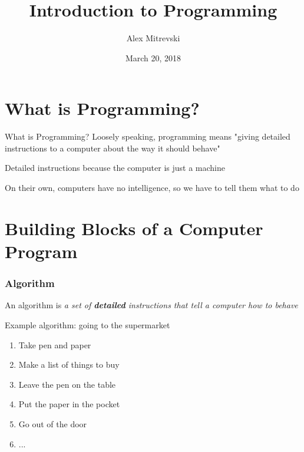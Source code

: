 \documentclass{beamer}
\author[Alex Mitrevski]{Alex Mitrevski}
\title{Introduction to Programming}
\subtitle{}
\institute[HBRS]{Hochschule Bonn-Rhein-Sieg}
\date{March 20, 2018}
\begin{document}
{
\begin{frame}
\titlepage
\end{frame}
}

%

\section{What is Programming?}

\begin{frame}{What is Programming?}
    Loosely speaking, programming means "giving detailed instructions to a computer about the way it should behave"
    \newline

    Detailed instructions because the computer is just a machine
    \newline

    On their own, computers have no intelligence, so we have to tell them what to do
\end{frame}

\section{Building Blocks of a Computer Program}

\begin{frame}
\frametitle{Algorithm}
    An algorithm is \emph{a set of \textbf{detailed} instructions that tell a computer how to behave}
    \newline

    Example algorithm: going to the supermarket
    \begin{enumerate}
        \item Take pen and paper
        \item Make a list of things to buy
        \item Leave the pen on the table
        \item Put the paper in the pocket
        \item Go out of the door
        \item ...
    \end{enumerate}
\end{frame}
\end{document}
